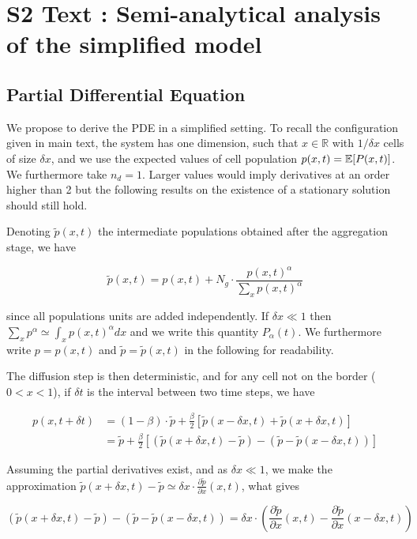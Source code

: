 


\section*{S2 Text : Semi-analytical analysis of the simplified model}


\subsection*{Partial Differential Equation}

We propose to derive the PDE in a simplified setting. To recall the configuration given in main text, the system has one dimension, such that $x\in \mathbb{R}$ with $1/\delta x$ cells of size $\delta x$, and we use the expected values of cell population $p(x,t) = \operatorname{\mathbb{E}}\!\left[P(x,t)\right]$. We furthermore take $n_d=1$. Larger values would imply derivatives at an order higher than 2 but the following results on the existence of a stationary solution should still hold. 

Denoting $\tilde{p}(x,t)$ the intermediate populations obtained after the aggregation stage, we have

\[
\tilde{p}(x,t) = p(x,t) + N_g\cdot \frac{p(x,t)^{\alpha}}{\sum_x p(x,t)^{\alpha}}
\]

since all populations units are added independently. If $\delta x \ll 1$ then $\sum_x p^{\alpha} \simeq \int_x p(x,t)^{\alpha}dx$ and we write this quantity $P_{\alpha}(t)$. We furthermore write $p=p(x,t)$ and $\tilde{p} = \tilde{p}(x,t)$ in the following for readability.

The diffusion step is then deterministic, and for any cell not on the border ($0<x<1$), if $\delta t$ is the interval between two time steps, we have

\[
\begin{split}
p(x,t+\delta t) & = (1 - \beta) \cdot \tilde{p} + \frac{\beta}{2} \left[\tilde{p}(x-\delta x,t) + \tilde{p}(x+\delta x,t)\right]\\
& = \tilde{p} + \frac{\beta}{2} \left[\left(\tilde{p}(x+\delta x,t) - \tilde{p}\right) - \left(\tilde{p} - \tilde{p}(x-\delta x,t)\right)\right]
\end{split}
\]

Assuming the partial derivatives exist, and as $\delta x \ll 1$, we make the approximation $\tilde{p}(x+\delta x,t) - \tilde{p} \simeq \delta x\cdot \frac{\partial \tilde{p}}{\partial{x}}(x,t)$, what gives 

\[
\left(\tilde{p}(x+\delta x,t) - \tilde{p}\right) - \left(\tilde{p} - \tilde{p}(x-\delta x,t)\right) = \delta x \cdot \left(\frac{\partial \tilde{p}}{\partial{x}}(x,t) - \frac{\partial \tilde{p}}{\partial{x}}(x - \delta x,t)\right)
\]

